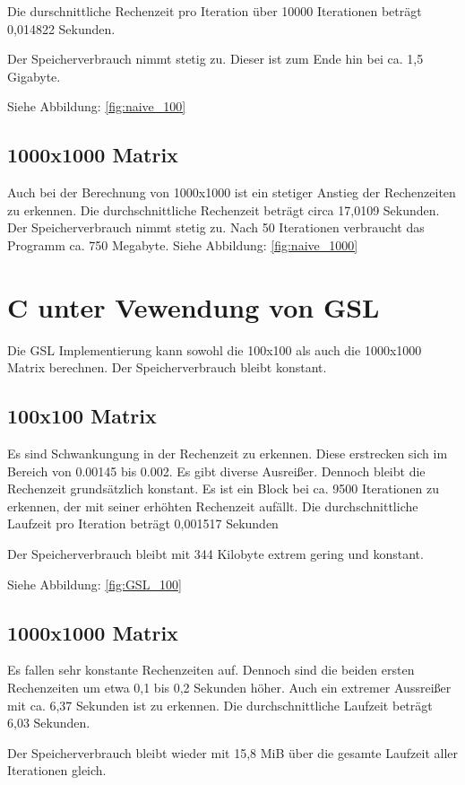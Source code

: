 Die durschnittliche Rechenzeit pro Iteration über 10000 Iterationen beträgt 0,014822 Sekunden.

Der Speicherverbrauch nimmt stetig zu. Dieser ist zum Ende hin bei ca. 1,5 Gigabyte.

Siehe Abbildung: \ref{fig:naive_100}


\subsection{1000x1000 Matrix}

Auch bei der Berechnung von 1000x1000 ist ein stetiger Anstieg der Rechenzeiten zu erkennen. Die durchschnittliche Rechenzeit beträgt circa 17,0109 Sekunden. Der Speicherverbrauch nimmt stetig zu. Nach 50 Iterationen verbraucht das Programm ca. 750 Megabyte.
Siehe Abbildung: \ref{fig:naive_1000}

\newpage
\section{C unter Vewendung von GSL}
Die GSL Implementierung kann sowohl die 100x100 als auch die 1000x1000 Matrix berechnen. Der Speicherverbrauch bleibt konstant.
\subsection{100x100 Matrix}

Es sind Schwankungung in der Rechenzeit zu erkennen. Diese erstrecken sich im Bereich von 0.00145 bis 0.002. Es gibt diverse Ausreißer. Dennoch bleibt die Rechenzeit grundsätzlich konstant. Es ist ein Block bei ca. 9500 Iterationen zu erkennen, der mit seiner erhöhten Rechenzeit aufällt.
Die durchschnittliche Laufzeit pro Iteration beträgt 0,001517 Sekunden

Der Speicherverbrauch bleibt mit 344 Kilobyte extrem gering und konstant.


Siehe Abbildung: \ref{fig:GSL_100}
\subsection{1000x1000 Matrix}
Es fallen sehr konstante Rechenzeiten auf. Dennoch sind die beiden ersten Rechenzeiten um etwa 0,1 bis 0,2 Sekunden höher. Auch ein extremer Aussreißer mit ca. 6,37 Sekunden ist zu erkennen. Die durchschnittliche Laufzeit beträgt 6,03 Sekunden.

Der Speicherverbrauch bleibt wieder mit 15,8 MiB über die gesamte Laufzeit aller Iterationen gleich.

